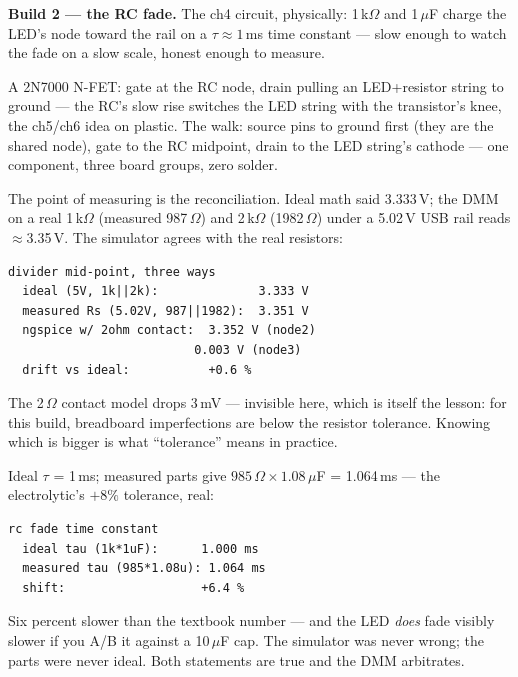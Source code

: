 \textbf{Build 2 --- the RC fade.} The ch4 circuit, physically:
1\,k$\Omega$ and 1\,$\mu$F charge the LED's node toward the rail on
a $\tau\approx1$\,ms time constant --- slow enough to watch the fade
on a slow scale, honest enough to measure.

\begin{example}
A 2N7000 N-FET: gate at the RC node, drain pulling an LED+resistor
string to ground --- the RC's slow rise switches the LED string with
the transistor's knee, the ch5/ch6 idea on plastic. The walk: source
pins to ground first (they are the shared node), gate to the RC
midpoint, drain to the LED string's cathode --- one component,
three board groups, zero solder.
\end{example}

\begin{example}
The point of measuring is the reconciliation. Ideal math said
3.333\,V; the DMM on a real 1\,k$\Omega$ (measured 987\,$\Omega$)
and 2\,k$\Omega$ (1982\,$\Omega$) under a 5.02\,V USB rail reads
$\approx$3.35\,V. The simulator agrees with the real resistors:

\begin{lstlisting}[caption={\ttfamily ch17\_compare.py output ---
ideal vs measured-resistor sim vs real.}]
divider mid-point, three ways
  ideal (5V, 1k||2k):              3.333 V
  measured Rs (5.02V, 987||1982):  3.351 V
  ngspice w/ 2ohm contact:  3.352 V (node2)
                          0.003 V (node3)
  drift vs ideal:           +0.6 %
\end{lstlisting}

The 2\,$\Omega$ contact model drops 3\,mV --- invisible here, which
is itself the lesson: for this build, breadboard imperfections are
below the resistor tolerance. Knowing which is bigger is what
``tolerance'' means in practice.
\end{example}

\begin{example}
Ideal $\tau$ = 1\,ms; measured parts give $985\,\Omega \times
1.08\,\mu$F = 1.064\,ms --- the electrolytic's $+8\%$ tolerance, real:

\begin{lstlisting}[caption={\ttfamily ch17\_rc\_fade\_measured.cir +
compare.py --- the measured-value sim.}]
rc fade time constant
  ideal tau (1k*1uF):      1.000 ms
  measured tau (985*1.08u): 1.064 ms
  shift:                   +6.4 %
\end{lstlisting}

Six percent slower than the textbook number --- and the LED
\emph{does} fade visibly slower if you A/B it against a 10\,$\mu$F
cap. The simulator was never wrong; the parts were never ideal.
Both statements are true and the DMM arbitrates.
\end{example}

